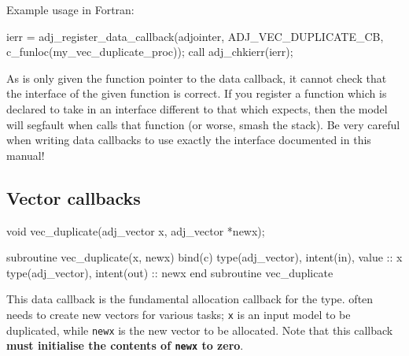 Example usage in Fortran:
\begin{framed}
\begin{minipage}{\columnwidth}
\begin{fortrancode}
  ierr = adj_register_data_callback(adjointer, ADJ_VEC_DUPLICATE_CB, 
                                    c_funloc(my_vec_duplicate_proc));
  call adj_chkierr(ierr);
\end{fortrancode}
\end{minipage}
\end{framed}

As \libadjoint is only given the function pointer to the data callback, it cannot check that the
interface of the given function is correct. If you register a function which is declared to take 
in an interface different to that which \libadjoint expects, then the model will segfault when
\libadjoint calls that function (or worse, smash the stack). Be very careful when writing data callbacks to use exactly
the interface documented in this manual!

\subsection{Vector callbacks} \label{sec:vector_callbacks}
\begin{framed}
\begin{minipage}{\columnwidth}
\begin{ccode}
  void vec_duplicate(adj_vector x, adj_vector *newx);
\end{ccode}
\begin{fortrancode}
  subroutine vec_duplicate(x, newx) bind(c)
    type(adj_vector), intent(in), value :: x
    type(adj_vector), intent(out) :: newx
  end subroutine vec_duplicate
\end{fortrancode}
\end{minipage}
\end{framed}
This data callback is the fundamental allocation callback for the  type. \libadjoint
often needs to create new vectors for various tasks; \texttt{x} is an
input model  to be duplicated, while \texttt{newx} is the new vector
to be allocated. Note that this callback \textbf{must initialise the contents of \texttt{newx} to zero}.

